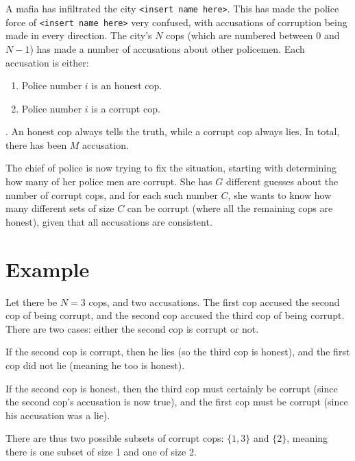 \newcommand\version{v1}
A mafia has infiltrated the city \texttt{<insert name here>}.
This has made the police force of \texttt{<insert name here>} very confused, with accusations of corruption being made in every direction.
The city's $N$ cops (which are numbered between $0$ and $N - 1$) has made a number of accusations about other policemen.
Each accusation is either:
\begin{enumerate}
  \item Police number $i$ is an honest cop.
  \item Police number $i$ is a corrupt cop.
\end{enumerate}.
An honest cop always tells the truth, while a corrupt cop always lies.
In total, there has been $M$ accusation.

The chief of police is now trying to fix the situation, starting with determining how many
of her police men are corrupt. She has $G$ different guesses about the number of corrupt cops,
and for each such number $C$, she wants to know how many different sets of size $C$ can be corrupt (where all the remaining cops are honest),
given that all accusations are consistent.

\section*{Example}
Let there be $N = 3$ cops, and two accusations.
The first cop accused the second cop of being corrupt, and the second cop accused the third cop of being corrupt.
There are two cases: either the second cop is corrupt or not.

If the second cop is corrupt, then he lies (so the third cop is honest), and the first cop did not lie (meaning he too is honest).

If the second cop is honest, then the third cop must certainly be corrupt (since the second cop's accusation is now true),
and the first cop must be corrupt (since his accusation was a lie).

There are thus two possible subsets of corrupt cops: $\{1, 3\}$ and $\{2\}$, meaning there is one subset of size 1 and one of size 2.

